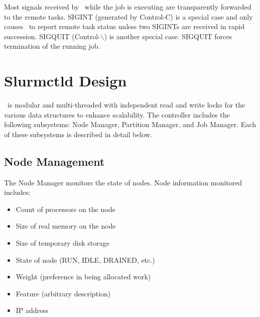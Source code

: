 \documentclass[10pt,onecolumn,times]{llncs}
\begin{document}
{Most signals received by \srun\ while the job is executing are
transparently forwarded to the remote tasks. SIGINT (generated by
Control-C) is a special case and only causes \srun\ to report
remote task status unless two SIGINTs are received in rapid succession.
SIGQUIT (Control-$\backslash$) is another special case. SIGQUIT forces
termination of the running job.

\section{Slurmctld Design}

\slurmctld\ is modular and multi-threaded with independent read and
write locks for the various data structures to enhance scalability.
The controller includes the following subsystems: Node Manager, Partition
Manager, and Job Manager.  Each of these subsystems is described in
detail below.

\subsection{Node Management}

The Node Manager monitors the state of nodes.  Node information monitored
includes:

\begin{itemize}
\item Count of processors on the node
\item Size of real memory on the node
\item Size of temporary disk storage
\item State of node (RUN, IDLE, DRAINED, etc.)
\item Weight (preference in being allocated work)
\item Feature (arbitrary description)
\item IP address
\end{itemize}

}
\end{document}
